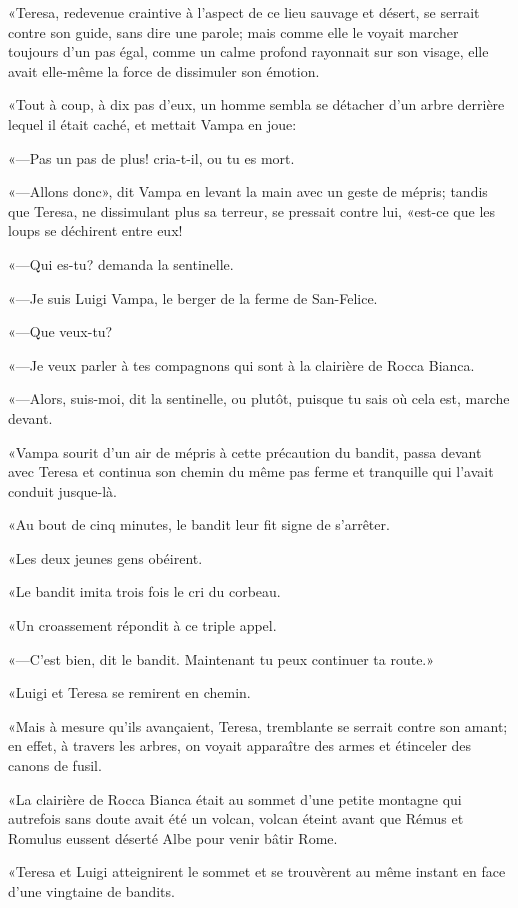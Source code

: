 «Teresa, redevenue craintive à l'aspect de ce lieu sauvage et désert, se serrait contre son guide, sans dire une parole; mais comme elle le voyait marcher toujours d'un pas égal, comme un calme profond rayonnait sur son visage, elle avait elle-même la force de dissimuler son émotion. 

«Tout à coup, à dix pas d'eux, un homme sembla se détacher d'un arbre derrière lequel il était caché, et mettait Vampa en joue: 

«—Pas un pas de plus! cria-t-il, ou tu es mort. 

«—Allons donc», dit Vampa en levant la main avec un geste de mépris; tandis que Teresa, ne dissimulant plus sa terreur, se pressait contre lui, «est-ce que les loups se déchirent entre eux! 

«—Qui es-tu? demanda la sentinelle. 

«—Je suis Luigi Vampa, le berger de la ferme de San-Felice. 

«—Que veux-tu? 

«—Je veux parler à tes compagnons qui sont à la clairière de Rocca Bianca. 

«—Alors, suis-moi, dit la sentinelle, ou plutôt, puisque tu sais où cela est, marche devant. 

«Vampa sourit d'un air de mépris à cette précaution du bandit, passa devant avec Teresa et continua son chemin du même pas ferme et tranquille qui l'avait conduit jusque-là. 

«Au bout de cinq minutes, le bandit leur fit signe de s'arrêter. 

«Les deux jeunes gens obéirent. 

«Le bandit imita trois fois le cri du corbeau. 

«Un croassement répondit à ce triple appel. 

«—C'est bien, dit le bandit. Maintenant tu peux continuer ta route.»  

«Luigi et Teresa se remirent en chemin. 

«Mais à mesure qu'ils avançaient, Teresa, tremblante se serrait contre son amant; en effet, à travers les arbres, on voyait apparaître des armes et étinceler des canons de fusil. 

«La clairière de Rocca Bianca était au sommet d'une petite montagne qui autrefois sans doute avait été un volcan, volcan éteint avant que Rémus et Romulus eussent déserté Albe pour venir bâtir Rome. 

«Teresa et Luigi atteignirent le sommet et se trouvèrent au même instant en face d'une vingtaine de bandits. 

